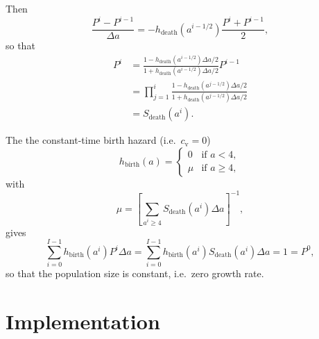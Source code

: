 \documentclass[12pt]{article}
\begin{document}
Then
\begin{equation}
  \frac{P^i - P^{i - 1}}{\Delta a}
  = - h_{\text{death}}(a^{i - 1 / 2})
  \frac{P^i + P^{i - 1}}{2},
\end{equation}
so that
\begin{equation}
  \label{eq:discrete_total}
  \begin{split}
    P^i
    &= \frac{
      1 - h_{\text{death}}(a^{i - 1 / 2}) \Delta a / 2
    }{
      1 + h_{\text{death}}(a^{i - 1 / 2}) \Delta a / 2
    } P^{i - 1}
    \\
    &= \prod_{j = 1}^i \frac{
      1 - h_{\text{death}}(a^{j - 1 / 2}) \Delta a / 2
    }{
      1 + h_{\text{death}}(a^{j - 1 / 2}) \Delta a / 2
    }
    \\
    &= S_{\text{death}}(a^i).
  \end{split}
\end{equation}

The the constant-time birth hazard
(i.e.~$c_{\mathrm{v}} = 0$)
\begin{equation}
  h_{\text{birth}}(a) =
  \begin{cases}
    0 & \text{if $a < 4$}, \\
    \mu & \text{if $a \geq 4$},
  \end{cases}
\end{equation}
with
\begin{equation}
  \mu =
  \left[
    \sum_{a^i \geq 4}
    S_{\text{death}}(a^i)
    \Delta a
  \right]^{-1},
\end{equation}
gives
\begin{equation}
  \sum_{i = 0}^{I - 1}
  h_{\text{birth}}(a^i) P^i
  \Delta a
  = \sum_{i = 0}^{I - 1}
  h_{\text{birth}}(a^i) S_{\text{death}}(a^i)
  \Delta a
  = 1 = P^0,
\end{equation}
so that the population size is constant, i.e.~zero growth rate.


\section{Implementation}
\end{document}
